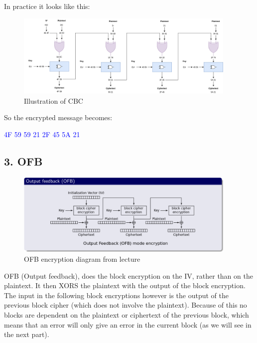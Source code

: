 \documentclass{article}
\begin{document}
In practice it looks like this: 
\begin{figure}[H]
 \centering
  \includegraphics[width=300pt]{img/CBC.png}
 \caption{Illustration of CBC}
 \end{figure}

So the encrypted message becomes:
\begin{tcolorbox}
\begin{center}
\textcolor{blue}{
\qquad 4F 59 59 21 2F 45 5A 21}
\end{center}
\end{tcolorbox}





\newpage
\subsection{3. OFB}


\begin{figure}[H]
 \centering
  \includegraphics[width=300pt]{img/ofbEnLecture.png}
 \caption{OFB encryption diagram from lecture}
 \end{figure}

OFB (Output feedback), does the block encryption on the IV, rather than on the plaintext. It then XORS the plaintext with the output of the block encryption. The input in the following block encryptions however is the output of the previous block cipher (which does not involve the plaintext). Because of this no blocks are dependent on the plaintext or ciphertext of the previous block, which means that an error will only give an error in the current block (as we will see in the next part). 
\end{document}
